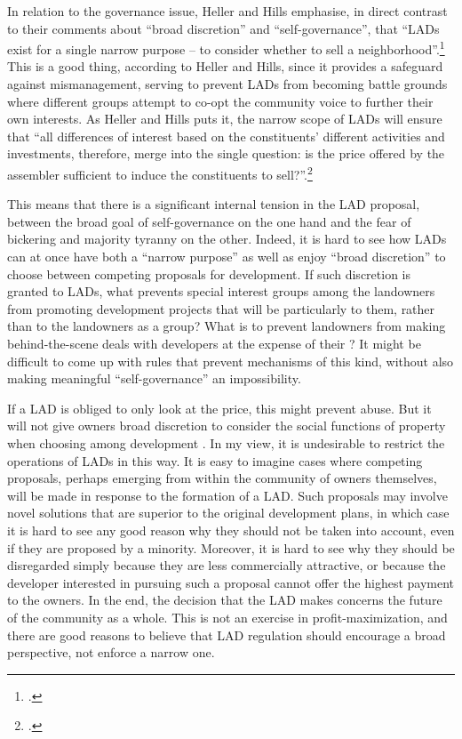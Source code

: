
In relation to the governance issue, Heller and Hills emphasise, in direct contrast to their comments about ``broad discretion'' and ``self-governance'', that ``LADs exist for a single narrow purpose -- to consider whether to sell a neighborhood''.\footcite[See][1500]{heller08} This is a good thing, according to Heller and Hills, since it provides a safeguard against mismanagement, serving to prevent LADs from becoming battle grounds where different groups attempt to co-opt the community voice to further their own interests. As Heller and Hills puts it, the narrow scope of LADs will ensure that ``all differences of interest based on the constituents' different activities and investments, therefore, merge into the single question: is the price offered by the assembler sufficient to induce the constituents to sell?''.\footcite[1500]{heller08}

This means that there is a significant internal tension in the LAD proposal, between the broad goal of self-governance on the one hand and the fear of  bickering and majority tyranny on the other. Indeed, it is hard to see how LADs can at once have both a ``narrow purpose'' as well as enjoy ``broad discretion'' to choose between competing proposals for development. If such discretion is granted to LADs, what prevents special interest groups among the landowners from promoting development projects that will be particularly  to them, rather than to the landowners as a group? What is to prevent landowners from making behind-the-scene deals with  developers at the expense of their ? It might be difficult to come up with rules that prevent mechanisms of this kind, without also making meaningful ``self-governance'' an impossibility. 

If a LAD is obliged to only look at the price, this might prevent abuse. But it will not give owners broad discretion to consider the social functions of property when choosing among development . %
In my view, it is undesirable to restrict the operations of LADs in this way. It is easy to imagine cases where competing proposals, perhaps emerging from within the community of owners themselves, will be made in response to the formation of a LAD. Such proposals may involve novel solutions that are superior to the original development plans, in which case it is hard to see any good reason why they should not be taken into account, even if they are proposed by a minority. Moreover, it is hard to see why they should be disregarded simply because they are less commercially attractive, or because the  developer interested in pursuing such a proposal cannot offer the highest payment to the owners. In the end, the decision that the LAD makes concerns the future of the community as a whole. This is not an exercise in profit-maximization, and there are good reasons to believe that LAD regulation should encourage a broad perspective, not enforce a narrow one.


